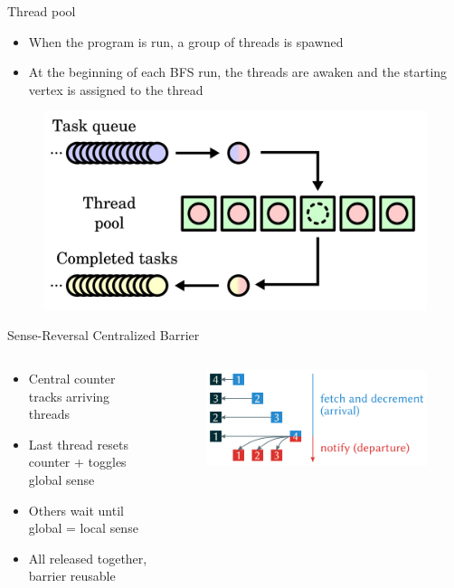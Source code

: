 \begin{frame}{Thread pool}
\begin{itemize}
  \item When the program is run, a group of threads is spawned
  \item At the beginning of each BFS run, the threads are awaken and the starting vertex is assigned to the  thread
\end{itemize}
\begin{figure}
  \centering
  \includegraphics[width=0.5\linewidth]{images/Thread_pool.png}
\end{figure}
\end{frame}
\begin{frame}{Sense-Reversal Centralized Barrier}
  \begin{columns}[c] %
    \begin{column}{0.6\textwidth}
      \begin{itemize}
        \item Central counter tracks arriving threads
        \item Last thread resets counter + toggles global sense
        \item Others wait until global = local sense
        \item All released together, barrier reusable
      \end{itemize}
    \end{column}

    \begin{column}{0.4\textwidth}
      \begin{figure}
        \centering
        \includegraphics[width=\linewidth]{images/barrier.png}
      \end{figure}
    \end{column}
  \end{columns}
\end{frame}